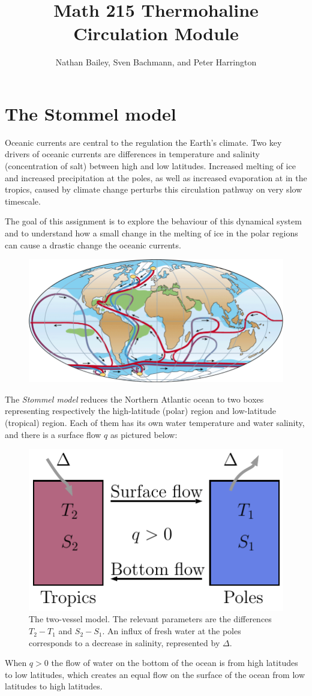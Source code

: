 \documentclass[10pt, letterpaper, answer]{exam}
\title{Math 215 Thermohaline Circulation Module}
\author{Nathan Bailey, Sven Bachmann, and Peter Harrington}
\date{}
\begin{document}
\maketitle
\section{The Stommel model}

Oceanic currents are central to the regulation the Earth's climate. Two key drivers of oceanic currents are differences in temperature and salinity (concentration of salt) between high and low latitudes. Increased melting
of ice and increased precipitation at the poles, as well as increased evaporation at in the tropics, caused by climate change perturbs this circulation pathway on very slow timescale.

The goal of this assignment is to explore the behaviour of this dynamical system and to understand how a small change in the melting of ice in the polar regions can cause a drastic change the oceanic currents. 

\begin{figure}[h]
    \centering
    \includegraphics[width=0.4\linewidth]{Simplified-sketch-of-the-global-thermohaline-circulation-pathway-whereby-yellow-dots.png}
    \label{fig:enter-label}
\end{figure}

The \emph{Stommel model} reduces the Northern Atlantic ocean to two boxes representing respectively the high-latitude (polar) region and low-latitude (tropical) region. Each of them has its own water temperature and water salinity, and there is a surface flow $q$ as pictured below:
\begin{figure}[h]
\centering
    \includegraphics[width = 0.3\linewidth]{Stommel.pdf}
    \caption{The two-vessel model. The relevant parameters are the differences $T_2 - T_1$ and $S_2 - S_1$. An influx of fresh water at the poles corresponds to a decrease in salinity, represented by $\Delta$.}
    \label{fig:enter-label}
\end{figure}
When $q>0$ the flow of water on the bottom of the ocean is from high latitudes to low latitudes, which creates an equal flow on the surface of the ocean from low latitudes to high latitudes.
\end{document}

